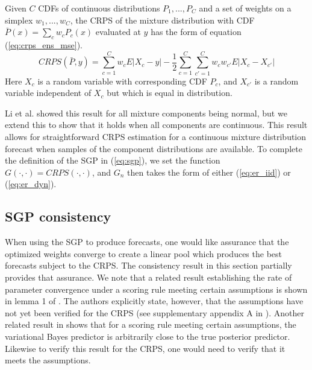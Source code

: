 \begin{proposition}
Given $C$ CDFs of continuous distributions $P_1, ..., P_C$ and 
a set of weights on a simplex $w_1, ..., w_C$, the CRPS of the mixture
distribution with CDF $\bar{P}(x) = \sum_c w_c P_c (x)$ evaluated at $y$ has
the form of equation (\ref{eq:crps_ens_mse}).
\begin{equation}
    \label{eq:crps_ens_mse}
    CRPS(\bar{P}, y) = \sum_{c = 1}^C w_c E|X_c - y| - 
    \frac{1}{2}\sum_{c = 1}^C \sum_{c' = 1}^C w_c w_{c'} E|X_c - X_{c'}|
\end{equation}
Here $X_c$ is a random variable with corresponding CDF $P_c$, and $X_{c'}$ is 
a random variable independent of $X_c$ but which is equal in distribution.
\label{prop:crps_ens_mse}
\end{proposition}
Li et al. \cite{li2019combining} showed this result for 
all mixture components being 
normal, but we extend this to show that it holds when all components are 
continuous. This result allows for straightforward CRPS estimation for a 
continuous mixture distribution forecast when samples of the component 
distributions are available. 
To complete the definition of the SGP in (\ref{eq:sgp}), we set the function 
$G(\cdot, \cdot) = CRPS(\cdot, \cdot)$, and $G_n$ then takes
the form of either 
(\ref{eq:er_iid}) or (\ref{eq:er_dyn}).

\subsection{SGP consistency}
When using the SGP to produce forecasts, one would like assurance
that the optimized weights converge to create a linear pool which produces the
best forecasts subject to the CRPS. The consistency result in this section
partially provides that assurance. We note that a related result establishing
the rate of parameter convergence under a scoring rule meeting certain 
assumptions is shown in 
lemma 1 of \cite[]{loaiza2021focused}. The authors explicitly state, however,
that the assumptions have not yet been verified
for the CRPS (see supplementary appendix A in \cite[]{loaiza2021focused}). 
Another related result in \cite[]{frazier2025loss} shows that for a scoring rule
meeting certain assumptions, the variational Bayes predictor is arbitrarily 
close to the true posterior predictor. Likewise to verify this result
for the CRPS, one would need to verify that 
it meets the assumptions.

